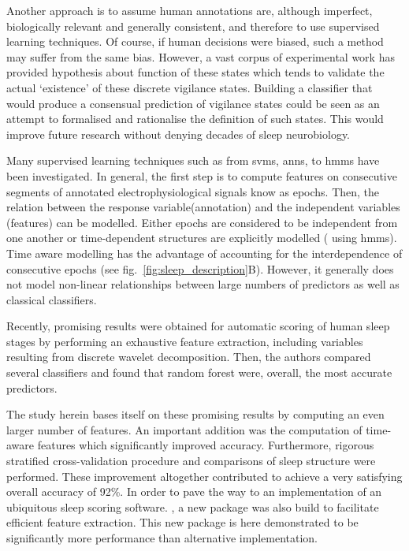 Another approach is to assume human annotations are, although imperfect, biologically relevant and generally consistent,
 and therefore to use supervised learning
 techniques\cite{crisler_sleep-stage_2008,ventouras_performance_2012,doroshenkov_classification_2007,pan_transition-constrained_2012,sen_comparative_2014}.
  Of course, if human decisions were biased, such a method may suffer from the same bias.
However, a vast corpus of experimental work has provided hypothesis about function of these states which tends to validate the actual `existence' of these discrete vigilance states.
Building a classifier that would produce a consensual prediction of vigilance states could be seen as an attempt to formalised and rationalise the definition of such states.
This would improve future research without denying decades of sleep neurobiology.

Many supervised learning techniques such as from
\glspl{svm}\cite{crisler_sleep-stage_2008},
\glspl{ann}\cite{ventouras_performance_2012},
to
\glspl{hmm}\cite{doroshenkov_classification_2007,pan_transition-constrained_2012} have been investigated.
In general, the first step is to compute features on consecutive segments of annotated electrophysiological signals know as epochs.
Then, the relation between the response variable(annotation) and the independent variables (features) can be modelled.
Either epochs are considered to be independent from one another or time-dependent structures are explicitly modelled (\eg{} using \glspl{hmm}).
Time aware modelling has the advantage of accounting for the interdependence of consecutive epochs (see fig.~\ref{fig:sleep_description}B).
However, it generally does not model non-linear relationships between large numbers of predictors as well as classical classifiers.

Recently, promising results were obtained for automatic scoring of human sleep stages by performing an exhaustive
feature extraction, including variables resulting from discrete wavelet
decomposition\cite{sen_comparative_2014}.
Then, the authors compared several classifiers and found that random
forest\cite{breiman_random_2001} were, overall, the most accurate predictors.

The study herein bases itself on these promising results by computing an even larger number of features.
An important addition was the computation of time-aware
features\cite{dietterich_machine_2002,deng_time_2013} which significantly improved
accuracy.
Furthermore, rigorous stratified cross-validation\cite{ding_querying_2008} procedure and
comparisons of sleep structure were performed.
These improvement altogether contributed to achieve a very satisfying overall accuracy of 92\%.
In order to pave the way to an implementation of an ubiquitous sleep scoring software.
\pr, a new \py{} package was also build to facilitate efficient feature extraction.
This new package is here demonstrated to be significantly more performance than alternative implementation.

